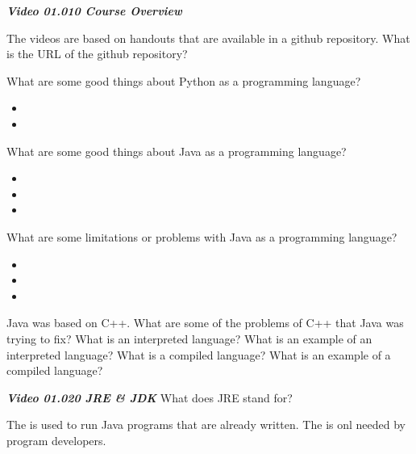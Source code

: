 \documentclass[letterpaper,11pt]{exam}
\newcommand{\videoheading}[1]{\Large\textbf{\textit{#1}}}
\begin{document}
%
%


\videoheading{Video 01.010 Course Overview}
\begin{questions}
\question The videos are based on handouts that are available in a github repository.  What is the URL of the github repository?
\vspace{.5cm}

\question What are some good things about Python as a programming language?
\begin{itemize}
        \item
        \item 
\end{itemize}
\question What are some good things about Java as a programming language?
\begin{itemize}
        \item
        \item 
        \item 
\end{itemize}

\begin{samepage}
\question What are some limitations or problems with Java as a programming language?
\begin{itemize}
    \item
    \item 
    \item 
\end{itemize}
\end{samepage}

\question Java was based on C++.  What are some of the problems of C++ that Java was trying to fix?
\vspace{1cm}
\question What is an interpreted language?  What is an example of an interpreted language?
\vspace{1cm}
\question What is a compiled language?  What is an example of a compiled language?
\vspace{.5cm}

\videoheading{Video 01.020 JRE \& JDK}
\question What does JRE stand for?

\question The \makebox[4em]{\hrulefill} is used to run Java programs that are already written.  The \makebox[4em]{\hrulefill} is onl needed by program developers.


\end{questions}
\end{document}

